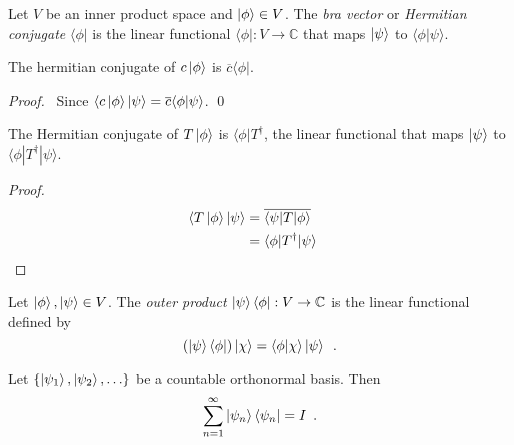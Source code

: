 \begin{df}
Let $V$ be an inner product space and $\left| {\phi} \right\rangle \in V$. The \emph{bra vector} or \emph{Hermitian conjugate} $\langle \phi |$ is the linear functional $\langle \phi | : V \rightarrow \mathbb{C}$ that maps $\left| {\psi} \right\rangle$ to $\langle \phi | \psi \rangle$.
\end{df}

\begin{prop}
The hermitian conjugate of $c \left| {\phi} \right\rangle$ is $\overline{c} \langle \phi |$.
\end{prop}

\begin{proof}
\pf\ Since $\langle c \left| {\phi} \right\rangle | \psi \rangle = \overline{c} \langle \phi | \psi \rangle$. \qed
\end{proof}

\begin{prop}
The Hermitian conjugate of $T \left| {\phi} \right\rangle$ is $\langle \phi | T^\dagger$, the linear functional that maps $\left| {\psi} \right\rangle$ to $\langle \phi | T^\dagger | \psi \rangle$.
\end{prop}

\begin{proof}
\pf
\begin{align*}
\langle T \left| {\phi} \right\rangle | \psi \rangle & = \overline{\langle \psi | T | \phi \rangle} \\
& = \langle \phi | T^\dagger | \psi \rangle & \relax
\end{align*}
\end{proof}

\begin{df}
Let $\left| {\phi} \right\rangle, \left| {\psi} \right\rangle \in V$. The \emph{outer product} $\left| {\psi} \right\rangle \langle \phi | : V \rightarrow \mathbb{C}$ is the linear functional defined by
\[ (\left| {\psi} \right\rangle \langle \phi |) \left| {\chi} \right\rangle = \langle \phi | \chi \rangle \left| {\psi} \right\rangle \enspace . \]
\end{df}

\begin{prop}
Let $\{ \left| {\psi_1} \right\rangle, \left| {\psi_2} \right\rangle, \ldots \}$ be a countable orthonormal basis. Then
\[ \sum_{n=1}^\infty \left| {\psi_n} \right\rangle \langle \psi_n | = I \enspace . \]
\end{prop}